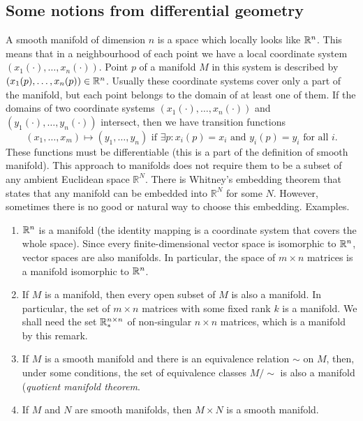 \subsection{Some notions from differential geometry}
A smooth manifold of dimension $n$ is a space which locally 
looks like $\mathbb{R}^n$. 
This means that in a neighbourhood of each point we have a local coordinate system $(x_1(\cdot), \dots,  x_n(\cdot))$.
Point $p$ of a manifold $M$ in this system is described by $(x_1(p), \dots, x_n(p)) \in \mathbb{R}^n$. Usually these coordinate systems 
cover only a part of the manifold, but each point belongs to the domain
of at least one of them.
If the domains of two coordinate systems $(x_1(\cdot), \dots, x_n(\cdot))$
and $(y_1(\cdot), \dots, y_n(\cdot))$ intersect, then we have transition functions
\begin{equation}
(x_1, \dots, x_m) \mapsto (y_1, \dots, y_n) \mbox{ if } \exists p : x_i(p) = x_i \mbox{ and } y_i(p) = y_i \mbox{ for all } i.
\end{equation}
These functions must be differentiable (this is a part of the definition of smooth manifold).
This approach to manifolds does not require them to be a subset of 
any ambient Euclidean space $\mathbb{R}^N$. There is Whitney's embedding theorem 
that states that any manifold can be embedded into $\mathbb{R}^N$
for some $N$. However, sometimes there is no good or natural way to choose this embedding.
Examples.
\begin{enumerate}
    \item $\mathbb{R}^n$ is a manifold (the identity mapping is a coordinate system that
        covers the whole space). Since every finite-dimensional vector space is 
        isomorphic to $\mathbb{R}^n$, vector spaces are also manifolds. In particular,
        the space of $m \times n$ matrices is a manifold isomorphic to $\mathbb{R}^n$.
    \item If $M$ is a manifold, then every open subset of $M$ is also a manifold.
        In particular, the set of $m \times n$ matrices with some fixed rank $k$
        is a manifold. We shall need the set $\mathbb{R}^{n \times n}_{*}$ of non-singular $n \times n$ matrices,
        which is a manifold by this remark.
    \item If $M$ is a smooth manifold and there is an equivalence relation $\sim$ on $M$,
        then, under some conditions, the set of equivalence classes $M / \sim$ is 
        also a manifold (\textit{quotient manifold theorem}.
    \item If $M$ and $N$ are smooth manifolds, then $M \times N$ is a smooth
        manifold.
\end{enumerate}


